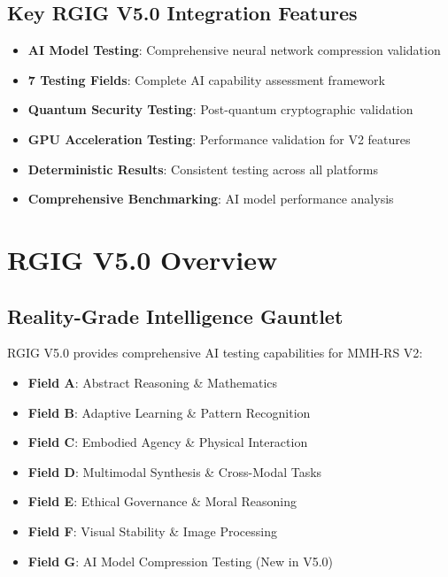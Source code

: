 \documentclass[12pt,a4paper]{article}
\begin{document}
\subsection{Key RGIG V5.0 Integration Features}
\begin{itemize}
    \item \textbf{AI Model Testing}: Comprehensive neural network compression validation
    \item \textbf{7 Testing Fields}: Complete AI capability assessment framework
    \item \textbf{Quantum Security Testing}: Post-quantum cryptographic validation
    \item \textbf{GPU Acceleration Testing}: Performance validation for V2 features
    \item \textbf{Deterministic Results}: Consistent testing across all platforms
    \item \textbf{Comprehensive Benchmarking}: AI model performance analysis
\end{itemize}

\section{RGIG V5.0 Overview}

\subsection{Reality-Grade Intelligence Gauntlet}
RGIG V5.0 provides comprehensive AI testing capabilities for MMH-RS V2:

\begin{itemize}
    \item \textbf{Field A}: Abstract Reasoning \& Mathematics
    \item \textbf{Field B}: Adaptive Learning \& Pattern Recognition
    \item \textbf{Field C}: Embodied Agency \& Physical Interaction
    \item \textbf{Field D}: Multimodal Synthesis \& Cross-Modal Tasks
    \item \textbf{Field E}: Ethical Governance \& Moral Reasoning
    \item \textbf{Field F}: Visual Stability \& Image Processing
    \item \textbf{Field G}: AI Model Compression Testing (New in V5.0)
\end{itemize}
\end{document}
